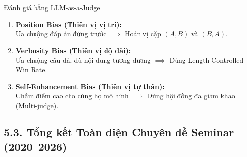 \begin{frame}{Đánh giá bằng LLM-as-a-Judge}
  \small
  \begin{enumerate}\setlength{\itemsep}{5pt}
    \item \textbf{Position Bias (Thiên vị vị trí):}\\
      Ưa chuộng đáp án đứng trước $\implies$ Hoán vị cặp $(A, B)$ và $(B, A)$.
    \item \textbf{Verbosity Bias (Thiên vị độ dài):}\\
      Ưa chuộng câu dài dù nội dung tương đương $\implies$ Dùng Length-Controlled Win Rate.
    \item \textbf{Self-Enhancement Bias (Thiên vị tự thân):}\\
      Chấm điểm cao cho cùng họ mô hình $\implies$ Dùng hội đồng đa giám khảo (Multi-judge).
  \end{enumerate}
  \par\vspace{0pt}
\end{frame}

\subsection{5.3. Tổng kết Toàn diện Chuyên đề Seminar (2020--2026)}

